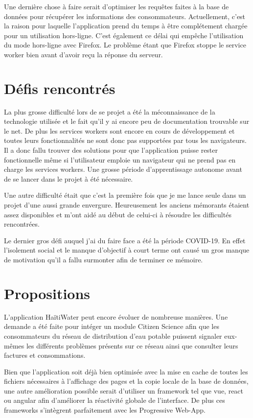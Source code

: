 \documentclass{EPL-master-thesis-covers-FR}
\begin{document}
			Une dernière chose à faire serait d'optimiser les requêtes faites à la base de données pour récupérer les informations des consommateurs. Actuellement, c'est la raison pour laquelle l'application prend du temps à être complétement chargée pour un utilisation hors-ligne. C'est également ce délai qui empêche l'utilisation du mode hors-ligne avec Firefox. Le problème étant que Firefox stoppe le service worker bien avant d'avoir reçu la réponse du serveur.
			

		\section{Défis rencontrés}
			La plus grosse difficulté lors de se projet a été la méconnaissance de la technologie utilisée et le fait qu'il y ai encore peu de documentation trouvable sur le net. De plus les services workers sont encore en cours de développement et toutes leurs fonctionnalités ne sont donc pas supportées par tous les navigateurs. Il a donc fallu trouver des solutions pour que l'application puisse rester fonctionnelle même si l'utilisateur emploie un navigateur qui ne prend pas en charge les services workers. Une grosse période d'apprentissage autonome avant de se lancer dans le projet à été nécessaire.
			
			Une autre difficulté était que c'est la première fois que je me lance seule dans un projet d'une aussi grande envergure. Heureusement les anciens mémorants étaient assez disponibles et m'ont aidé au début de celui-ci à résoudre les difficultés rencontrées.
			
			Le dernier gros défi auquel j'ai du faire face a été la période COVID-19. En effet l'isolement social et le manque d'objectif à court terme ont causé un gros manque de motivation  qu'il a fallu surmonter afin de terminer ce mémoire.
			

		\section{Propositions}
			L'application HaïtiWater peut encore évoluer de nombreuse manières. Une demande a été faite pour intéger un module Citizen Science afin que les consommateurs du réseau de distribution d'eau potable puissent signaler eux-mêmes les différents problèmes présents sur ce réseau ainsi que consulter leurs factures et consommations.
			
			Bien que l'application soit déjà bien optimisée avec la mise en cache de toutes les fichiers nécessaires à l'affichage des pages et la copie locale de la base de données, une autre amélioration possible serait d'utiliser un framework tel que vue, react ou angular afin d'améliorer la réactivité globale de l'interface. De plus ces frameworks s'intègrent parfaitement avec les Progressive Web-App.
			
\end{document}
